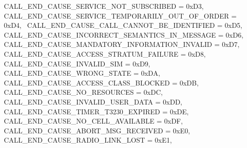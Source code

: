 \begin{DoxyItemize}
 C\+A\+L\+L\+\_\+\+E\+N\+D\+\_\+\+C\+A\+U\+S\+E\+\_\+\+S\+E\+R\+V\+I\+C\+E\+\_\+\+N\+O\+T\+\_\+\+S\+U\+B\+S\+C\+R\+I\+B\+ED = 0x\+D3,~\newline
 C\+A\+L\+L\+\_\+\+E\+N\+D\+\_\+\+C\+A\+U\+S\+E\+\_\+\+S\+E\+R\+V\+I\+C\+E\+\_\+\+T\+E\+M\+P\+O\+R\+A\+R\+I\+L\+Y\+\_\+\+O\+U\+T\+\_\+\+O\+F\+\_\+\+O\+R\+D\+ER = 0x\+D4,~\newline
 C\+A\+L\+L\+\_\+\+E\+N\+D\+\_\+\+C\+A\+U\+S\+E\+\_\+\+C\+A\+L\+L\+\_\+\+C\+A\+N\+N\+O\+T\+\_\+\+B\+E\+\_\+\+I\+D\+E\+N\+T\+I\+F\+I\+ED = 0x\+D5,~\newline
 C\+A\+L\+L\+\_\+\+E\+N\+D\+\_\+\+C\+A\+U\+S\+E\+\_\+\+I\+N\+C\+O\+R\+R\+E\+C\+T\+\_\+\+S\+E\+M\+A\+N\+T\+I\+C\+S\+\_\+\+I\+N\+\_\+\+M\+E\+S\+S\+A\+GE = 0x\+D6,~\newline
 C\+A\+L\+L\+\_\+\+E\+N\+D\+\_\+\+C\+A\+U\+S\+E\+\_\+\+M\+A\+N\+D\+A\+T\+O\+R\+Y\+\_\+\+I\+N\+F\+O\+R\+M\+A\+T\+I\+O\+N\+\_\+\+I\+N\+V\+A\+L\+ID = 0x\+D7,~\newline
 C\+A\+L\+L\+\_\+\+E\+N\+D\+\_\+\+C\+A\+U\+S\+E\+\_\+\+A\+C\+C\+E\+S\+S\+\_\+\+S\+T\+R\+A\+T\+U\+M\+\_\+\+F\+A\+I\+L\+U\+RE = 0x\+D8,~\newline
 C\+A\+L\+L\+\_\+\+E\+N\+D\+\_\+\+C\+A\+U\+S\+E\+\_\+\+I\+N\+V\+A\+L\+I\+D\+\_\+\+S\+IM = 0x\+D9,~\newline
 C\+A\+L\+L\+\_\+\+E\+N\+D\+\_\+\+C\+A\+U\+S\+E\+\_\+\+W\+R\+O\+N\+G\+\_\+\+S\+T\+A\+TE = 0x\+DA,~\newline
 C\+A\+L\+L\+\_\+\+E\+N\+D\+\_\+\+C\+A\+U\+S\+E\+\_\+\+A\+C\+C\+E\+S\+S\+\_\+\+C\+L\+A\+S\+S\+\_\+\+B\+L\+O\+C\+K\+ED = 0x\+DB,~\newline
 C\+A\+L\+L\+\_\+\+E\+N\+D\+\_\+\+C\+A\+U\+S\+E\+\_\+\+N\+O\+\_\+\+R\+E\+S\+O\+U\+R\+C\+ES = 0x\+DC,~\newline
 C\+A\+L\+L\+\_\+\+E\+N\+D\+\_\+\+C\+A\+U\+S\+E\+\_\+\+I\+N\+V\+A\+L\+I\+D\+\_\+\+U\+S\+E\+R\+\_\+\+D\+A\+TA = 0x\+DD,~\newline
 C\+A\+L\+L\+\_\+\+E\+N\+D\+\_\+\+C\+A\+U\+S\+E\+\_\+\+T\+I\+M\+E\+R\+\_\+\+T3230\+\_\+\+E\+X\+P\+I\+R\+ED = 0x\+DE,~\newline
 C\+A\+L\+L\+\_\+\+E\+N\+D\+\_\+\+C\+A\+U\+S\+E\+\_\+\+N\+O\+\_\+\+C\+E\+L\+L\+\_\+\+A\+V\+A\+I\+L\+A\+B\+LE = 0x\+DF,~\newline
 C\+A\+L\+L\+\_\+\+E\+N\+D\+\_\+\+C\+A\+U\+S\+E\+\_\+\+A\+B\+O\+R\+T\+\_\+\+M\+S\+G\+\_\+\+R\+E\+C\+E\+I\+V\+ED = 0x\+E0,~\newline
 C\+A\+L\+L\+\_\+\+E\+N\+D\+\_\+\+C\+A\+U\+S\+E\+\_\+\+R\+A\+D\+I\+O\+\_\+\+L\+I\+N\+K\+\_\+\+L\+O\+ST = 0x\+E1,~\newline

\end{DoxyItemize}
